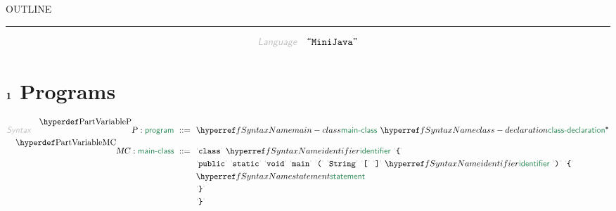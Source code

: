


    OUTLINE
  \tableofcontents
\begin{center}
\rule{3in}{0.4pt}
\end{center}

\begin{displaymath}
\KEY{Language} \quad \STRING{MiniJava}
\end{displaymath}

\section{$\SECT{1}$ Programs}\hypertarget{sect1-programs}{}\label{sect1-programs}

\begin{align*}
  \KEY{Syntax} \quad
    \VARDECL{P} : \SYN{program}
      \ ::= \ & \
      \SYNREF{main-class} \ \SYNREF{class-declaration}\STAR
    \\
    \VARDECL{MC} : \SYN{main-class}
      \ ::= \ & \
      \LEX{class} \ \SYNREF{identifier} \ \LEX{{\LEFTBRACE}} \\
                                                               & \ \LEX{public} \ \LEX{static} \ \LEX{void} \ \LEX{main} \ \LEX{{(}} \ \LEX{String} \ \LEX{{[}} \ \LEX{{]}} \ \SYNREF{identifier} \ \LEX{{)}} \ \LEX{{\LEFTBRACE}} \\
                                                                                                                                                                                                                                                                                                      & \ \SYNREF{statement} \\
                                                                                                                                                                                                                                                                                                                           & \ \LEX{{\RIGHTBRACE}} \\
                                                                                                                                                                                                                                                                                                                                                & \ \LEX{{\RIGHTBRACE}}
\end{align*}
